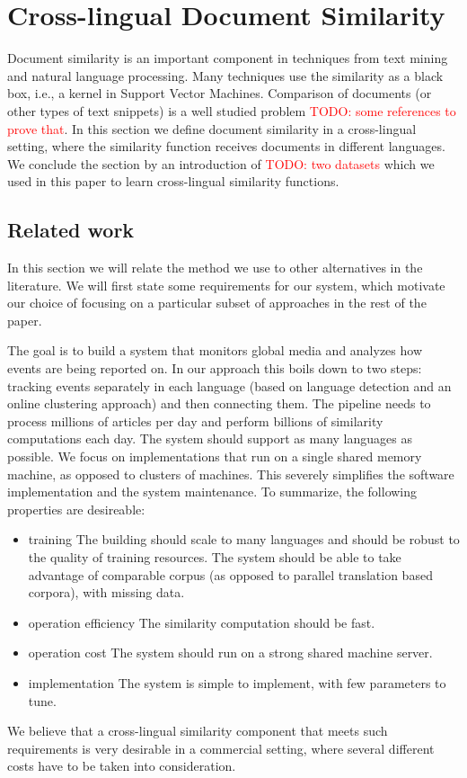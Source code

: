 \documentclass[twoside,11pt]{article}
\newcommand{\todo}[1]{\textcolor{red}{TODO: #1}}
\begin{document}
\section{Cross-lingual Document Similarity}

Document similarity is an important component in techniques from text mining and natural language processing. Many techniques use the similarity as a black box, i.e., a kernel in Support Vector Machines. Comparison of documents (or other types of text snippets) is a well studied problem \todo{some references to prove that}. In this section we define document similarity in a cross-lingual setting, where the similarity function receives documents in different languages. We conclude the section by an introduction of \todo{two datasets} which we used in this paper to learn cross-lingual similarity functions.

\subsection{Related work}

In this section we will relate the method we use to other alternatives in the literature. We will first state some requirements for our system, which motivate our choice of focusing on a particular subset of approaches in the rest of the paper.

The goal is to build a system that monitors global media and analyzes how events are being reported on. In our approach this boils down to two steps: tracking events separately in each language (based on language detection and an online clustering approach) and then connecting them. The pipeline needs to process millions of articles per day and perform billions of similarity computations each day. The system should support as many languages as possible. We focus on implementations that run on a single shared memory machine, as opposed to clusters of machines. This severely simplifies the software implementation and the system maintenance.
To summarize, the following properties are desireable:
\begin{itemize}
\item{training} The building should scale to many languages and should be robust to the quality of training resources. The system should be able to take advantage of comparable corpus (as opposed to parallel translation based corpora), with missing data.
\item{operation efficiency} The similarity computation should be fast.
\item{operation cost} The system should run on a strong shared machine server.
\item{implementation} The system is simple to implement, with few parameters to tune.
\end{itemize}
We believe that a cross-lingual similarity component that meets such requirements is very desirable in a commercial setting, where several different costs have to be taken into consideration.
\end{document}
